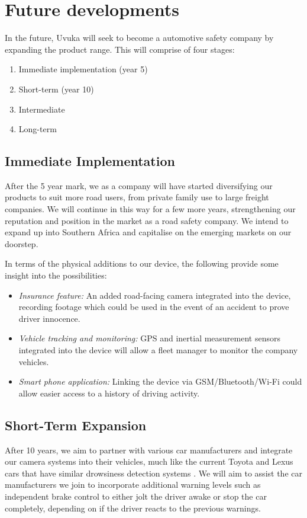 \section{Future developments}
In the future, Uvuka will seek to become a automotive safety company by expanding the product range. This will comprise of four stages:
\begin{enumerate}
\item Immediate implementation (year 5)
\item Short-term (year 10)
\item Intermediate
\item Long-term
\end{enumerate}

\subsection{Immediate Implementation}
After the 5 year mark, we as a company will have started diversifying our products to suit more road users, from private family use to large freight companies. We will continue in this way for a few more years, strengthening our reputation and position in the market as a road safety company. We intend to expand up into Southern Africa and capitalise on the emerging markets on our doorstep.

In terms of the physical additions to our device, the following provide some insight into the possibilities:
\begin{itemize}
\item \textit{Insurance feature:} An added road-facing camera integrated into the device, recording footage which could be used in the event of an accident to prove driver innocence.

\item \textit{Vehicle tracking and monitoring:} GPS and inertial measurement sensors integrated into the device will allow a fleet manager to monitor the company vehicles.

\item \textit{Smart phone application:} Linking the device via GSM/Bluetooth/Wi-Fi could allow easier access to a history of driving activity.
\end{itemize}

\subsection{Short-Term Expansion}
After 10 years, we aim to partner with various car manufacturers and integrate our camera systems into their vehicles, much like the current Toyota and Lexus cars that have similar drowsiness detection systems \cite{lexus} \cite{toyota}. We will aim to assist the car manufacturers we join to incorporate additional warning levels such as independent brake control to either jolt the driver awake or stop the car completely, depending on if the driver reacts to the previous warnings.

